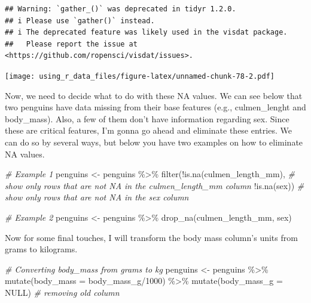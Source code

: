 \documentclass[
]{book}
\newenvironment{Shaded}{\begin{snugshade}}{\end{snugshade}}
\newcommand{\AttributeTok}[1]{\textcolor[rgb]{0.77,0.63,0.00}{#1}}
\newcommand{\CommentTok}[1]{\textcolor[rgb]{0.56,0.35,0.01}{\textit{#1}}}
\newcommand{\ConstantTok}[1]{\textcolor[rgb]{0.00,0.00,0.00}{#1}}
\newcommand{\DecValTok}[1]{\textcolor[rgb]{0.00,0.00,0.81}{#1}}
\newcommand{\FunctionTok}[1]{\textcolor[rgb]{0.00,0.00,0.00}{#1}}
\newcommand{\NormalTok}[1]{#1}
\newcommand{\OtherTok}[1]{\textcolor[rgb]{0.56,0.35,0.01}{#1}}
\newcommand{\SpecialCharTok}[1]{\textcolor[rgb]{0.00,0.00,0.00}{#1}}
\begin{document}
\begin{verbatim}
## Warning: `gather_()` was deprecated in tidyr 1.2.0.
## i Please use `gather()` instead.
## i The deprecated feature was likely used in the visdat package.
##   Please report the issue at <https://github.com/ropensci/visdat/issues>.
\end{verbatim}

\texttt{[image: using\_r\_data\_files/figure-latex/unnamed-chunk-78-2.pdf]}

Now, we need to decide what to do with these NA values.
We can see below that two penguins have data missing from their base features (e.g., culmen\_lenght and body\_mass).
Also, a few of them don't have information regarding sex.
Since these are critical features, I'm gonna go ahead and eliminate these entries.
We can do so by several ways, but below you have two examples on how to eliminate NA values.

\begin{Shaded}
\begin{Highlighting}[]
\CommentTok{\# Example 1}
\NormalTok{penguins }\OtherTok{\textless{}{-}}\NormalTok{ penguins }\SpecialCharTok{\%\textgreater{}\%} 
  \FunctionTok{filter}\NormalTok{(}\SpecialCharTok{!}\FunctionTok{is.na}\NormalTok{(culmen\_length\_mm),  }\CommentTok{\# show only rows that are not NA in the culmen\_length\_mm column}
         \SpecialCharTok{!}\FunctionTok{is.na}\NormalTok{(sex)) }\CommentTok{\# show only rows that are not NA in the sex column}

\CommentTok{\# Example 2}
\NormalTok{penguins }\OtherTok{\textless{}{-}}\NormalTok{ penguins }\SpecialCharTok{\%\textgreater{}\%} 
  \FunctionTok{drop\_na}\NormalTok{(culmen\_length\_mm, sex)}
\end{Highlighting}
\end{Shaded}

Now for some final touches, I will transform the body mass column's units from grams to kilograms.

\begin{Shaded}
\begin{Highlighting}[]
\CommentTok{\# Converting body\_mass from grams to kg}
\NormalTok{penguins }\OtherTok{\textless{}{-}}\NormalTok{ penguins }\SpecialCharTok{\%\textgreater{}\%} 
  \FunctionTok{mutate}\NormalTok{(}\AttributeTok{body\_mass =}\NormalTok{ body\_mass\_g}\SpecialCharTok{/}\DecValTok{1000}\NormalTok{) }\SpecialCharTok{\%\textgreater{}\%} 
  \FunctionTok{mutate}\NormalTok{(}\AttributeTok{body\_mass\_g =} \ConstantTok{NULL}\NormalTok{)  }\CommentTok{\# removing old column}
\end{Highlighting}
\end{Shaded}
\end{document}
